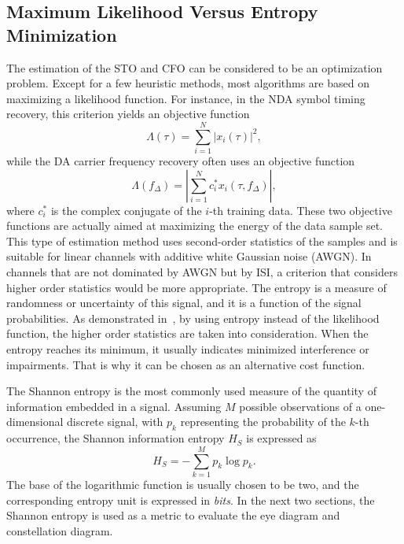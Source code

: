 \documentclass[12pt, draftclsnofoot, onecolumn]{IEEEtran}
\begin{document}
\subsection{Maximum Likelihood Versus Entropy Minimization}
\label{sec:versus}
The estimation of the STO and CFO can be considered to be an optimization problem.
Except for a few heuristic methods, most algorithms are based on maximizing a likelihood function.
For instance, in the NDA symbol timing recovery, this criterion yields an objective function~\cite{mengali1997synchronization}
\begin{equation}
\Lambda(\tau) =\sum\limits_{i = 1}^N {{{\left| {{x_i}( \tau )} \right|}^2}}, 
\end{equation}
while the DA carrier frequency recovery often uses an objective function~\cite{mengali1997synchronization} 
\begin{equation}
\Lambda ({f_\Delta })=\left| \sum\limits_{i = 1}^N {{{{c_i^*{x_i}(\tau ,{f_\Delta })}}}} \right|, 
\end{equation}
where \(c_i^*\) is the complex conjugate of the \(i\)-th training data.
These two objective functions are actually aimed at maximizing the energy of the data sample set.
This type of estimation method uses second-order statistics of the samples and is suitable for linear channels with additive white Gaussian noise (AWGN).
In channels that are not dominated by AWGN but by ISI, a criterion that considers higher order statistics would be more appropriate.
The entropy is a measure of randomness or uncertainty of this signal, and it is a function of the signal probabilities.
As demonstrated in~\cite{Santamaria2002}, by using entropy instead of the likelihood function, the higher order statistics are taken into consideration.
When the entropy reaches its minimum, it usually indicates minimized interference or impairments.
That is why it can be chosen as an alternative cost function.

The Shannon entropy is the most commonly used measure of the quantity of information  embedded in a signal.
Assuming \(M\) possible observations of a one-dimensional discrete signal, with \(p_k\) representing the probability of the \(k\)-th occurrence, the Shannon information entropy \(H_S\) is expressed as~\cite{Shannon1948}
\begin{equation}
H_S =  - \sum\limits_{k = 1}^M {{p_k}\log {p_k}}.
\label{eq:entropy}
\end{equation}
The base of the logarithmic function is usually chosen to be two, and the corresponding entropy unit is expressed in \textit{bits}.
In the next two sections, the Shannon entropy is used as a metric to evaluate the eye diagram and constellation diagram.
\end{document}
